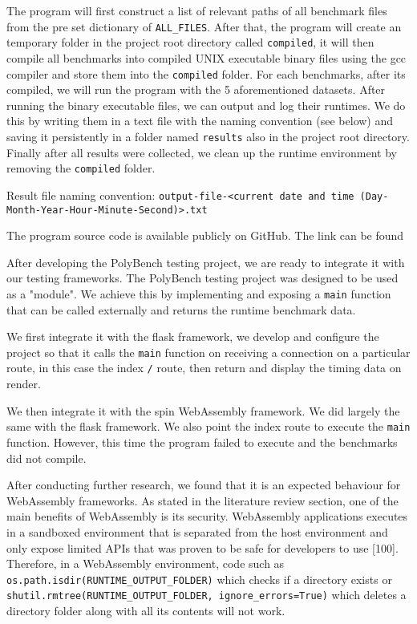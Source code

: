 The program will first construct a list of relevant paths of all benchmark files from the pre set dictionary of \texttt{ALL_FILES}. After that, the program will create an temporary folder in the project root directory called \texttt{compiled}, it will then compile all benchmarks into compiled UNIX executable binary files using the gcc compiler and store them into the \texttt{compiled} folder. For each benchmarks, after its compiled, we will run the program with the 5 aforementioned datasets. After running the binary executable files, we can output and log their runtimes. We do this by writing them in a text file with the naming convention (see below) and saving it persistently in a folder named \texttt{results} also in the project root directory. Finally after all results were collected, we clean up the runtime environment by removing the \texttt{compiled} folder.

Result file naming convention:
\newline
\texttt{output-file-<current date and time (Day-Month-Year-Hour-Minute-Second)>.txt}

The program source code is available publicly on GitHub.
\newline
The link can be found \href{https://github.com/richard875/Honours-PolyBench}{\color{blue}{here (GitHub: richard875/Honours-PolyBench)}}

After developing the PolyBench testing project, we are ready to integrate it with our testing frameworks. The PolyBench testing project was designed to be used as a "module". We achieve this by implementing and exposing a \texttt{main} function that can be called externally and returns the runtime benchmark data.

We first integrate it with the flask framework, we develop and configure the project so that it calls the \texttt{main} function on receiving a connection on a particular route, in this case the index \texttt{/} route, then return and display the timing data on render.

We then integrate it with the spin WebAssembly framework. We did largely the same with the flask framework. We also point the index route to execute the \texttt{main} function. However, this time the program failed to execute and the benchmarks did not compile.

After conducting further research, we found that it is an expected behaviour for WebAssembly frameworks. As stated in the literature review section, one of the main benefits of WebAssembly is its security. WebAssembly applications executes in a sandboxed environment that is separated from the host environment and only expose limited APIs that was proven to be safe for developers to use [100]. Therefore, in a WebAssembly environment, code such as \texttt{os.path.isdir(RUNTIME_OUTPUT_FOLDER)} which checks if a directory exists or \texttt{shutil.rmtree(RUNTIME_OUTPUT_FOLDER, ignore_errors=True)} which deletes a directory folder along with all its contents will not work.

